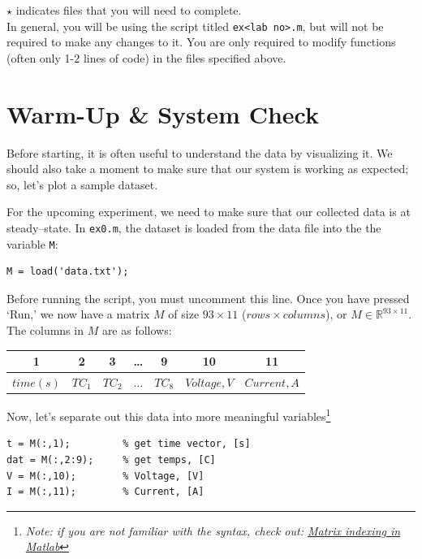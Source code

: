 \documentclass[11pt, letterpaper]{article}
\begin{document}
\noindent
$\star$ indicates files that you will need to complete.\\


In general, you will be using the script titled \texttt{ex<lab no>.m}, but will not be required to make any changes to it. You are only required to modify functions (often only 1-2 lines of code) in the files specified above. 

\setcounter{section}{-1}
\section{Warm-Up \& System Check}

Before starting, it is often useful to understand the data by visualizing it. We should also take a moment to make sure that our system is working as expected; so, let's plot a sample dataset.

\n
For the upcoming experiment, we need to make sure that our collected data is at steady--state. In \texttt{ex0.m}, the dataset is loaded from the data file into the the variable \texttt{M}:
\n
\begin{lstlisting}[numbers=none]
% load tab separated data
M = load('data.txt'); 
\end{lstlisting}
\n

Before running the script, you must uncomment this line. Once you have pressed `Run,' we now have a matrix $M$ of size $93 \times 11$ ($rows \times columns$), or $M \in \mathbb{R}^{93 \times 11}$. The columns in $M$ are as follows:
\\
{\small
\begin{center}\renewcommand{\arraystretch}{1.5}
\begin{tabular}{|c | c | c | c | c | c | c |}
\hline
\rowcolor{light-gray}
    1 & 2 & 3 & \dots & 9 & 10 & 11 \\ 
    \hline
   \cellcolor{green!10} $time (s)$ & \cellcolor{red!10}$TC_1$ & \cellcolor{red!10}$TC_2$ & \cellcolor{red!10}$\dots$ & \cellcolor{red!10}$TC_8$ & \cellcolor{orange!10}$Voltage, V$ & \cellcolor{orange!10}$Current, A$ \\ 
\hline
\end{tabular}
\end{center}
}


Now, let's separate out this data into more meaningful variables\footnote{\textit{Note: if you are not familiar with the syntax, check out: \href{https://www.mathworks.com/company/newsletters/articles/matrix-indexing-in-matlab.html}{Matrix indexing in Matlab}  }}
\n
\begin{lstlisting}[numbers=none]
t = M(:,1);         % get time vector, [s]
dat = M(:,2:9);     % get temps, [C]
V = M(:,10);        % Voltage, [V]
I = M(:,11);        % Current, [A]
\end{lstlisting}
\end{document}
